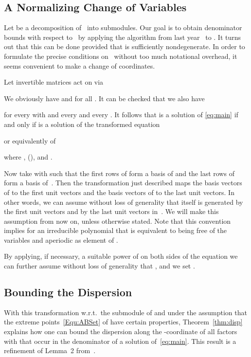 \documentclass[a4paper]{sig-alternate}
\begin{document}
\subsection{A Normalizing Change of Variables}\label{sec:normal}

Let  be a decomposition of~ into submodules.
Our goal is to obtain denominator bounds with respect to~ by applying the
algorithm from last year~\cite{kauers10b} to .
It turns out that this can be done provided
that  is sufficiently nondegenerate. In order to formulate the precise
conditions on~ without too much notational overhead, it seems convenient
to make a change of coordinates.

Let invertible matrices 
act on  via

We obviously have  and
 for all .
It can be checked that we also have

for every  with  and
every  and every .
It follows that  is a solution of \eqref{eq:main}
if and only if  is a solution of the transformed equation

or equivalently of

where , 
(), and .

Now take  with  such that the first  rows of 
form a basis of  and the last  rows of  form
a basis of~. Then the transformation just described maps
the basis vectors of  to the first  unit vectors and the basis
vectors of  to the last  unit vectors. In other words, we can
assume without loss of generality that  itself is generated by the
first  unit vectors and  by the last  unit vectors in~.
We will make this assumption from now on, unless otherwise stated.
Note that this convention implies for an irreducible polynomial 
that  is equivalent to  being free of the variables
 and aperiodic as element of .

By applying, if necessary, a suitable power of  on both sides of the
equation we can further assume without loss of generality that
, and we set
.
\subsection{Bounding the Dispersion}

With this transformation w.r.t.\ the submodule  of  and under the assumption that the extreme points~\eqref{Equ:ABSet} of  have certain properties, Theorem~\ref{thm:disp} explains how one can bound the dispersion along the -coordinate of all factors  with  that occur in the denominator of a solution of~\eqref{eq:main}. This result is a refinement of Lemma~2 from~\cite{kauers10b}.
\end{document}
